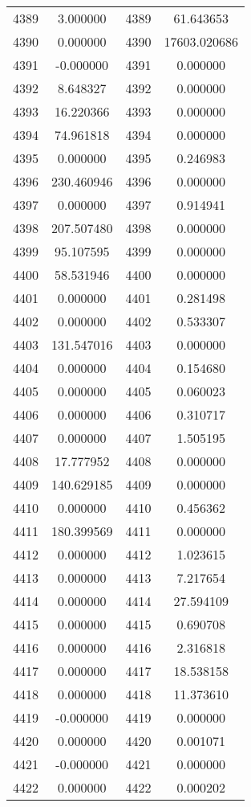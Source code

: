 \documentclass[12pt]{article}
\begin{document}
\begin{longtable}{@{}cccc@{}}
4389 & 3.000000 & 4389 & 61.643653 \\
4390 & 0.000000 & 4390 & 17603.020686 \\
4391 & -0.000000 & 4391 & 0.000000 \\
4392 & 8.648327 & 4392 & 0.000000 \\
4393 & 16.220366 & 4393 & 0.000000 \\
4394 & 74.961818 & 4394 & 0.000000 \\
4395 & 0.000000 & 4395 & 0.246983 \\
4396 & 230.460946 & 4396 & 0.000000 \\
4397 & 0.000000 & 4397 & 0.914941 \\
4398 & 207.507480 & 4398 & 0.000000 \\
4399 & 95.107595 & 4399 & 0.000000 \\
4400 & 58.531946 & 4400 & 0.000000 \\
4401 & 0.000000 & 4401 & 0.281498 \\
4402 & 0.000000 & 4402 & 0.533307 \\
4403 & 131.547016 & 4403 & 0.000000 \\
4404 & 0.000000 & 4404 & 0.154680 \\
4405 & 0.000000 & 4405 & 0.060023 \\
4406 & 0.000000 & 4406 & 0.310717 \\
4407 & 0.000000 & 4407 & 1.505195 \\
4408 & 17.777952 & 4408 & 0.000000 \\
4409 & 140.629185 & 4409 & 0.000000 \\
4410 & 0.000000 & 4410 & 0.456362 \\
4411 & 180.399569 & 4411 & 0.000000 \\
4412 & 0.000000 & 4412 & 1.023615 \\
4413 & 0.000000 & 4413 & 7.217654 \\
4414 & 0.000000 & 4414 & 27.594109 \\
4415 & 0.000000 & 4415 & 0.690708 \\
4416 & 0.000000 & 4416 & 2.316818 \\
4417 & 0.000000 & 4417 & 18.538158 \\
4418 & 0.000000 & 4418 & 11.373610 \\
4419 & -0.000000 & 4419 & 0.000000 \\
4420 & 0.000000 & 4420 & 0.001071 \\
4421 & -0.000000 & 4421 & 0.000000 \\
4422 & 0.000000 & 4422 & 0.000202 \\

\end{longtable}
\end{document}
